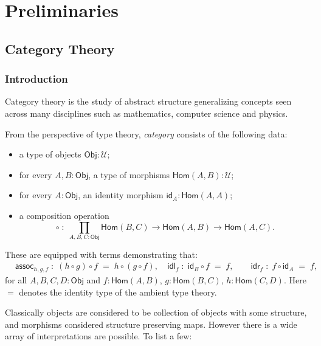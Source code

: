 \chapter{Preliminaries} \label{prelim}
\section{Category Theory}
\subsection{Introduction}
Category theory is the study of abstract structure generalizing
concepts seen across many disciplines such as mathematics, computer
science and physics. \cite{maclane1998-categories-book,awodey2010-category-theory-book} 
\begin{definition}
	From the perspective of type theory, \emph{category} consists
	of the following data:
	\begin{itemize}
		\item a type of objects $\mathsf{Obj} : \mathcal{U}$;
		\item for every $A,B:\mathsf{Obj}$, a type of morphisms
		      $\mathsf{Hom}(A,B) : \mathcal{U}$;
		\item for every $A:\mathsf{Obj}$, an identity morphism
		      $\mathsf{id}_A : \mathsf{Hom}(A,A)$;
		\item a composition operation
		      \[
			      \circ \;:\; \prod_{A,B,C:\mathsf{Obj}}
			      \mathsf{Hom}(B,C) \to \mathsf{Hom}(A,B) \to \mathsf{Hom}(A,C).
		      \]
	\end{itemize}
	These are equipped with terms demonstrating that:
	$$
		\begin{aligned}
			 & \mathsf{assoc}_{h,g,f} \;:\;
			(h \circ g) \circ f \;=\; h \circ (g \circ f),                  \
			 & \mathsf{idl}_{f} \;:\; \mathsf{id}_B \circ f \;=\; f, \qquad
			\mathsf{idr}_{f} \;:\; f \circ \mathsf{id}_A \;=\; f,
		\end{aligned}
	$$
	for all $A,B,C,D:\mathsf{Obj}$ and
	$f:\mathsf{Hom}(A,B)$, $g:\mathsf{Hom}(B,C)$, $h:\mathsf{Hom}(C,D)$.
	Here $=$ denotes the identity type of the ambient type theory.
\end{definition}
Classically objects are considered to be collection of objects with some structure, and morphisms considered structure preserving maps. However there is a wide array of interpretations are possible. To list a few:
